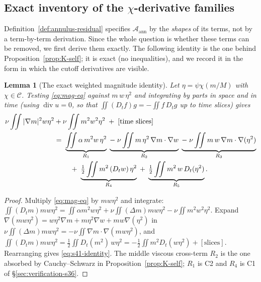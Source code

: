 \documentclass[11pt]{article}
\newtheorem{lemma}[theorem]{Lemma}
\theoremstyle{definition}
\theoremstyle{remark}
\newcommand{\divg}{\operatorname{div}}
\begin{document}
\subsection{Exact inventory of the $\chi$-derivative families}
\label{subsec:s41-inventory}

Definition~\ref{def:annulus-residual} specifies $\mathcal{A}_{\mathrm{ann}}$
by the \emph{shapes} of its terms, not by a term-by-term derivation. Since
the whole question is whether these terms can be removed, we first derive
them exactly. The following identity is the one behind
Proposition~\ref{prop:K-self}; it is exact (no inequalities), and we record
it in the form in which the cutoff derivatives are visible.

\begin{lemma}[The exact weighted magnitude identity]\label{lem:s41-identity}
  Let $\eta=\psi\chi(m/M)$ with $\chi\in\mathcal{C}$. Testing
  \eqref{eq:mag-eq} against $m\,w\,\eta^2$ and integrating by parts in space
  and in time (using $\divg u=0$, so that
  $\iint(D_tf)g=-\iint f\,D_tg$ up to time slices) gives
  \begin{align}
    \nu\iint|\nabla m|^2w\eta^2
    &+\nu\iint m^2w^2\eta^2
      \;+\;[\text{time slices}] \notag\\
    &=\;\underbrace{\iint\alpha\,m^2w\,\eta^2}_{R_1}
      \;\underbrace{-\;\nu\iint m\,\eta^2\,\nabla m\cdot\nabla w}_{R_2}
      \;\underbrace{-\;\nu\iint m\,w\,\nabla m\cdot\nabla(\eta^2)}_{R_3}
      \notag\\
    &\qquad
      \;+\;\underbrace{\tfrac12\iint m^2\,(D_tw)\,\eta^2}_{R_4}
      \;+\;\underbrace{\tfrac12\iint m^2\,w\,D_t(\eta^2)}_{R_5} .
      \label{eq:s41-identity}
  \end{align}
\end{lemma}
\begin{proof}
  Multiply \eqref{eq:mag-eq} by $mw\eta^2$ and integrate:
  $\iint(D_tm)mw\eta^2=\iint\alpha m^2w\eta^2
  +\nu\iint(\Delta m)mw\eta^2-\nu\iint m^2w^2\eta^2$.
  Expand $\nabla(mw\eta^2)=w\eta^2\nabla m+m\eta^2\nabla w+mw\nabla(\eta^2)$
  in $\nu\iint(\Delta m)mw\eta^2=-\nu\iint\nabla m\cdot\nabla(mw\eta^2)$,
  and $\iint(D_tm)mw\eta^2=\tfrac12\iint D_t(m^2)\,w\eta^2
  =-\tfrac12\iint m^2D_t(w\eta^2)+[\text{slices}]$. Rearranging gives
  \eqref{eq:s41-identity}. The middle viscous cross-term $R_2$ is the one
  absorbed by Cauchy--Schwarz in Proposition~\ref{prop:K-self}; $R_1$ is C2
  and $R_4$ is C1 of \S\ref{sec:verification-s36}.
\end{proof}
\end{document}
